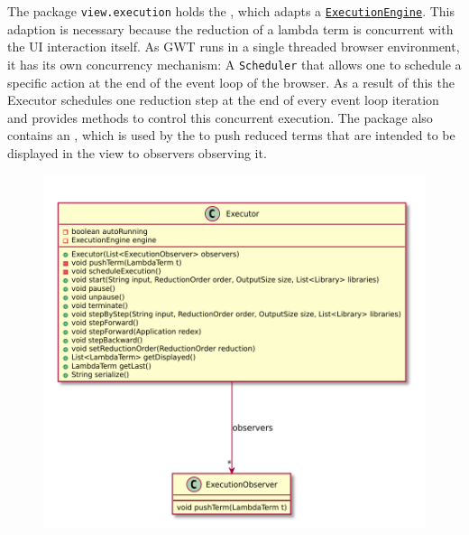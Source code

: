 The package \texttt{view.execution} holds the \texttt{}, which adapts a \texttt{\hyperref[type:edu.kit.wavelength.client.model.ExecutionEngine]{ExecutionEngine}}.
This adaption is necessary because the reduction of a lambda term is concurrent with the UI interaction itself. 
As GWT runs in a single threaded browser environment, it has its own concurrency mechanism: A \texttt{Scheduler} that allows one to schedule a specific action at the end of the event loop of the browser.
As a result of this the Executor schedules one reduction step at the end of every event loop iteration and provides methods to control this concurrent execution.
The package also contains an \texttt{}, which is used by the \texttt{} to push reduced terms that are intended to be displayed in the view to observers observing it.

\begin{figure}[H]
	\centering
	\includegraphics[width=\textwidth]{packageDiagrams/executionPackage}
\end{figure}
